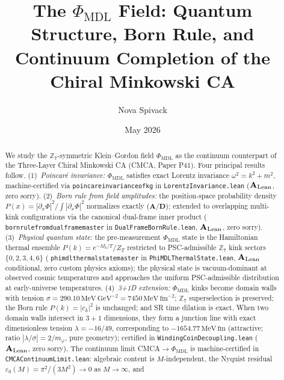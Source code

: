 \documentclass[11pt]{article}
\theoremstyle{remark}
\newcommand{\PHIMDL}{\Phi_{\mathrm{MDL}}}
\newcommand{\ZS}{\mathbb{Z}_7}
\newcommand{\lean}[1]{%
  \penalty-100
  \begingroup\def\_{\textunderscore\allowbreak}\texttt{#1}\endgroup}
\newcommand{\epsz}{\varepsilon_0}
\newcommand{\CatAL}{\ensuremath{\textbf{A}_{\rm Lean}}}
\newcommand{\CatAD}{\textbf{A/D}}
\begin{document}
\title{\textbf{The $\PHIMDL$ Field: Quantum Structure, Born Rule,
  and Continuum Completion of the Chiral Minkowski CA}}

\author{Nova Spivack}
\date{May 2026}
\maketitle

\NovaZenodoAfterTitle

\begin{abstract}
We study the $\ZS$-symmetric Klein--Gordon field $\PHIMDL$ as the continuum
counterpart of the Three-Layer Chiral Minkowski CA (CMCA, Paper P41).
Four principal results follow.
(1)~\textit{Poincar\'e invariance:} $\PHIMDL$ satisfies exact Lorentz
invariance $\omega^2 = k^2 + m^2$, machine-certified via
\lean{poincare\_invariance\_of\_kg} in \lean{LorentzInvariance.lean}
($\CatAL$, zero sorry).
(2)~\textit{Born rule from field amplitudes:} the position-space probability
density $P(x) = |\partial_x\Phi|^2 / \int|\partial_x\Phi|^2$ normalizes
exactly ($\CatAD$); extended to overlapping multi-kink configurations via the
canonical dual-frame inner product (\lean{born\_rule\_from\_dual\_frame\_master}
in \lean{DualFrameBornRule.lean}, $\CatAL$, zero sorry).
(3)~\textit{Physical quantum state:} the pre-measurement $\PHIMDL$ state is
the Hamiltonian thermal ensemble $P(k) = e^{-M_k/T}/Z_T$ restricted to
PSC-admissible $\ZS$ kink sectors $\{0,2,3,4,6\}$
(\lean{phimdl\_thermal\_state\_master} in \lean{PhiMDLThermalState.lean},
$\CatAL$ conditional, zero custom physics axioms); the physical state is
vacuum-dominant at observed cosmic temperatures and approaches the uniform
PSC-admissible distribution at early-universe temperatures.
(4)~\textit{3+1D extension:} $\PHIMDL$ kinks become domain walls with
tension $\sigma = 290.10\,\mathrm{MeV\,GeV}^{-2} = 7450\,\mathrm{MeV\,fm}^{-2}$;
$\ZS$ superselection is preserved; the Born rule $P(k)=|c_k|^2$ is
unchanged; and SR time dilation is exact.  When two domain walls
intersect in $3+1$ dimensions, they form a junction line with exact
dimensionless tension $\lambda = -16/49$, corresponding to
$-1654.77\,\mathrm{MeV\,fm}$ (attractive; ratio
$|\lambda/\sigma| = 2/m_\varphi$, pure geometry); certified in
\lean{WindingCoinDecoupling.lean} ($\CatAL$, zero sorry).
The continuum limit CMCA$\to\PHIMDL$ is machine-certified in
\lean{CMCAContinuumLimit.lean}: algebraic content is $M$-independent, the
Nyquist residual $\epsz(M) = \pi^2/(3M^2)\to 0$ as $M\to\infty$, and

\end{abstract}
\end{document}
